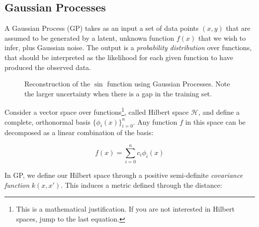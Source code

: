\subsection{Gaussian Processes}
A Gaussian Process (GP) takes as an input a set of data points $(x, y)$ that are assumed to be generated by a latent, unknown function $f(x)$ that we wish to infer, plus Gaussian noise. The output is a \emph{probability distribution} over functions, that should be interpreted as the likelihood for each given function to have produced the observed data.


\begin{figure}[htb]
	\centering
	\hfill
	\caption{Reconstruction of the $\sin$ function using Gaussian Processes.
	Note the larger uncertainty when there is a gap in the training set.}\label{fig:gp_toy}
\end{figure}


Consider a vector space over functions\footnote{This is a mathematical justification. If you are not interested in Hilbert spaces, jump to the last equation.}, called Hilbert space $\mathscr{H}$, and define a complete, orthonormal basis $\{\phi_i(x)\}_{i=0}^{n}$.
Any function $f$ in this space can be decomposed as a linear combination of the basis:

 \[f(x) = \sum_{i=0}^{n} c_i \phi_i(x)\]
 
In GP, we define our Hilbert space through a positive semi-definite \emph{covariance function} $k(x, x')$.
This induces a metric defined through the distance:

